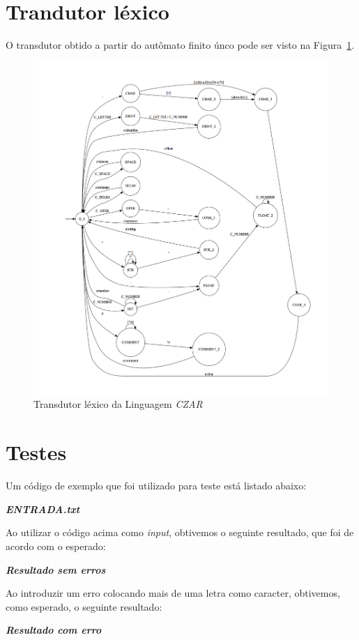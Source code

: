 \section{Trandutor léxico}

O transdutor obtido a partir do autômato finito únco pode ser visto na Figura~\ref{fig:transdutor}.

\begin{figure}
	\centering 
	\includegraphics[width=\textwidth]{images/transdutor.png} 
	\caption{Transdutor léxico da Linguagem \emph{CZAR}}
	\label{fig:transdutor}
\end{figure}

\section{Testes}


Um código de exemplo que foi utilizado para teste está listado abaixo:

\textbf{\emph{ENTRADA.txt}}


Ao utilizar o código acima como \emph{input}, obtivemos o seguinte resultado, que foi de acordo com o esperado:

\textbf{\emph{Resultado sem erros}}


Ao introduzir um erro colocando mais de uma letra como caracter, obtivemos, como esperado, o seguinte resultado:

\textbf{\emph{Resultado com erro}}
